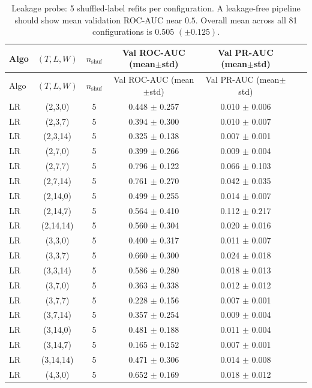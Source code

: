 \begin{longtable}{lcccccc}
\caption{Leakage probe: 5 shuffled-label refits per configuration.  A leakage-free pipeline should show mean validation ROC-AUC near $0.5$.  Overall mean across all 81 configurations is $0.505$ $(\pm 0.125)$.}\label{tab:v2_leakage}\\
\toprule
Algo & $(T,L,W)$ & $n_{\text{shuf}}$ & Val ROC-AUC (mean$\pm$std) & Val PR-AUC (mean$\pm$std) \\
\midrule
\endfirsthead
\toprule
Algo & $(T,L,W)$ & $n_{\text{shuf}}$ & Val ROC-AUC (mean$\pm$std) & Val PR-AUC (mean$\pm$std) \\
\midrule
\endhead
\bottomrule
\endfoot
LR & (2,3,0) & 5 & 0.448 $\pm$ 0.257 & 0.010 $\pm$ 0.006 \\
LR & (2,3,7) & 5 & 0.394 $\pm$ 0.300 & 0.010 $\pm$ 0.007 \\
LR & (2,3,14) & 5 & 0.325 $\pm$ 0.138 & 0.007 $\pm$ 0.001 \\
LR & (2,7,0) & 5 & 0.399 $\pm$ 0.266 & 0.009 $\pm$ 0.004 \\
LR & (2,7,7) & 5 & 0.796 $\pm$ 0.122 & 0.066 $\pm$ 0.103 \\
LR & (2,7,14) & 5 & 0.761 $\pm$ 0.270 & 0.042 $\pm$ 0.035 \\
LR & (2,14,0) & 5 & 0.499 $\pm$ 0.255 & 0.014 $\pm$ 0.007 \\
LR & (2,14,7) & 5 & 0.564 $\pm$ 0.410 & 0.112 $\pm$ 0.217 \\
LR & (2,14,14) & 5 & 0.560 $\pm$ 0.304 & 0.020 $\pm$ 0.016 \\
LR & (3,3,0) & 5 & 0.400 $\pm$ 0.317 & 0.011 $\pm$ 0.007 \\
LR & (3,3,7) & 5 & 0.660 $\pm$ 0.300 & 0.024 $\pm$ 0.018 \\
LR & (3,3,14) & 5 & 0.586 $\pm$ 0.280 & 0.018 $\pm$ 0.013 \\
LR & (3,7,0) & 5 & 0.363 $\pm$ 0.338 & 0.012 $\pm$ 0.012 \\
LR & (3,7,7) & 5 & 0.228 $\pm$ 0.156 & 0.007 $\pm$ 0.001 \\
LR & (3,7,14) & 5 & 0.357 $\pm$ 0.254 & 0.009 $\pm$ 0.004 \\
LR & (3,14,0) & 5 & 0.481 $\pm$ 0.188 & 0.011 $\pm$ 0.004 \\
LR & (3,14,7) & 5 & 0.165 $\pm$ 0.152 & 0.007 $\pm$ 0.001 \\
LR & (3,14,14) & 5 & 0.471 $\pm$ 0.306 & 0.014 $\pm$ 0.008 \\
LR & (4,3,0) & 5 & 0.652 $\pm$ 0.169 & 0.018 $\pm$ 0.012 \\

\end{longtable}

